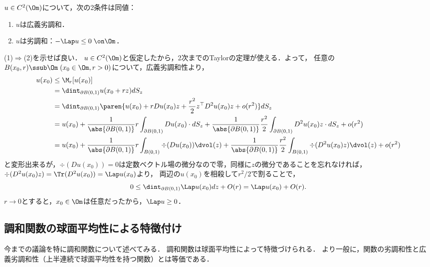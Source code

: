 \documentclass[uplatex,dvipdfmx]{jsreport}
\begin{document}
\begin{theorem}[2つの定義の同値性]
    $u\in C^2(\Om)$について，次の2条件は同値：
    \begin{enumerate}
        \item $u$は広義劣調和．
        \item $u$は劣調和：$-\Lap u\le0\;\on\Om$．
    \end{enumerate}
\end{theorem}
\begin{Proof}
    (1)$\Rightarrow$(2)を示せば良い．
    $u\in C^2(\Om)$と仮定したから，2次までのTaylorの定理が使える．よって，
    任意の$B(x_0,r)\ssub\Om\;(x_0\in\Om,r>0)$について，広義劣調和性より，
    \begin{align*}
        u(x_0)&\le\M_r[u(x_0)]\\
        &=\dint_{\partial B(0,1)}u(x_0+rz)dS_z\\
        &=\dint_{\partial B(0,1)}\paren{u(x_0)+rDu(x_0)z+\frac{r^2}{2}z^\top D^2u(x_0)z+o(r^2)}dS_z\\
        &=u(x_0)+\frac{1}{\abs{\partial B(0,1)}}r\int_{\partial B(0,1)}Du(x_0)\cdot dS_z+\frac{1}{\abs{\partial B(0,1)}}\frac{r^2}{2}\int_{\partial B(0,1)}D^2u(x_0)z\cdot dS_z+o(r^2)\\
        &=u(x_0)+\frac{1}{\abs{\partial B(0,1)}}r\int_{B(0,1)}\div(Du(x_0))\dvol(z)+\frac{1}{\abs{\partial  B(0,1)}}\frac{r^2}{2}\int_{B(0,1)}\div(D^2u(x_0)z)\dvol(z)+o(r^2)
    \end{align*}
    と変形出来るが，$\div(Du(x_0))=0$は定数ベクトル場の微分なので零，同様に$z$の微分であることを忘れなければ，$\div(D^2u(x_0)z)=\Tr(D^2u(x_0))=\Lap u(x_0)$より，
    両辺の$u(x_0)$を相殺して$r^2/2$で割ることで，
    \[0\le\dint_{\partial B(0,1)}\Lap u(x_0)dz+O(r)=\Lap u(x_0)+O(r).\]
    $r\to0$とすると，$x_0\in\Om$は任意だったから，$\Lap u\ge0$．
\end{Proof}

\subsection{調和関数の球面平均性による特徴付け}

\begin{tcolorbox}[colframe=ForestGreen, colback=ForestGreen!10!white,breakable,colbacktitle=ForestGreen!40!white,coltitle=black,fonttitle=\bfseries\sffamily,
title=]
    今までの議論を特に調和関数について述べてみる．
    調和関数は球面平均性によって特徴づけられる．
    より一般に，関数の劣調和性と広義劣調和性（上半連続で球面平均性を持つ関数）とは等価である．
\end{tcolorbox}
\end{document}
